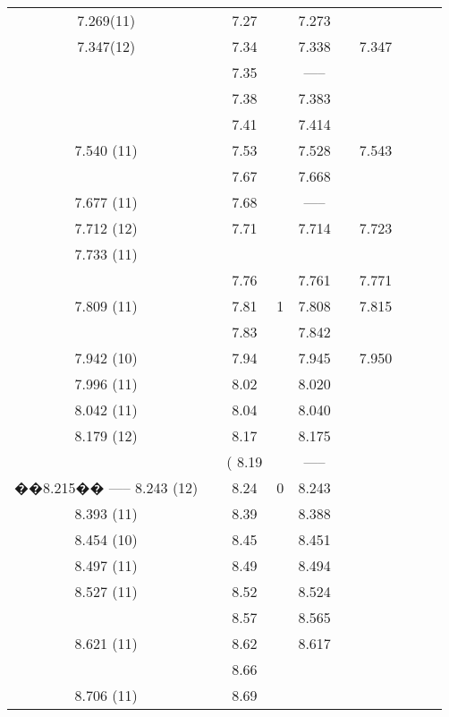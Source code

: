 \begin{landscape}
\begin{center}
\begin{longtable}{cc cc cc cc cc}
7.269(11)   &   & 7.27  &   & 7.273 &   &   &   &   &   \\
7.347(12)   &   & 7.34  &   & 7.338 &   & 7.347 &   &   &   \\
  &   & 7.35  &   & ----- &   &   &   &   &   \\
  &   & 7.38  &   & 7.383 &   &   &   &   &   \\
  &   & 7.41  &   & 7.414 &   &   &   &   &   \\
  7.540 (11)    &   & 7.53  &   & 7.528 &   & 7.543 &   &   &   \\
  &   & 7.67  &   & 7.668 &   &   &   &   &   \\
  7.677 (11)    &   & 7.68  &   & ----- &   &   &   &   &   \\
  7.712 (12)    &   & 7.71  &   & 7.714 &   & 7.723 &   &   &   \\
  7.733 (11)    &   &       &   &   &   &   &   &   \\
  &   & 7.76  &   & 7.761 &   & 7.771 &   &   &   \\
  7.809 (11)    &   & 7.81  & 1 & 7.808 &   & 7.815 &   &   &   \\
  &   & 7.83  &   & 7.842 &   &   &   &   &   \\
  7.942 (10)    &   & 7.94  &   & 7.945 &   & 7.950 &   &   &   \\
  7.996 (11)    &   & 8.02  &   & 8.020 &   &   &   &   &   \\
  8.042 (11)    &   & 8.04  &   & 8.040 &   &   &   &   &   \\
  8.179 (12)    &   & 8.17  &   & 8.175 &   &   &   &   &   \\
  &   & ( 8.19  &   & ----- &   &   &   &   &   \\
      ��8.215��         -----
  8.243 (12)    &   & 8.24  & 0 & 8.243 &   &   &   &   &   \\
  8.393 (11)    &   & 8.39  &   & 8.388 &   &   &   &   &   \\
  8.454 (10)    &   & 8.45  &   & 8.451 &   &   &   &   &   \\
  8.497 (11)    &   & 8.49  &   & 8.494 &   &   &   &   &   \\
  8.527 (11)    &   & 8.52  &   & 8.524 &   &   &   &   &   \\
  &   & 8.57  &   & 8.565 &   &   &   &   &   \\
  8.621 (11)    &   & 8.62  &   & 8.617 &   &   &   &   &   \\
  &   & 8.66  &   &   &   &   &   &   &   \\
  8.706 (11)    &   & 8.69  &   &   &   &   &   &   &   \\

\end{longtable}
\end{center}
\end{landscape}
